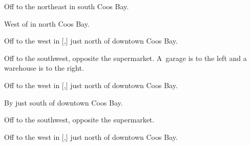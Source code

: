 

\begin{LocationList}

Off  to the northeast in south Coos Bay.

\Location{\GasStation \Gas}
West of  in north Coos Bay.

Off  to the west in [,] just north of downtown Coos Bay.

Off  to the southwest, opposite the supermarket.
A~garage is to the left and a warehouse is to the right.

Off  to the west in [,] just north of downtown Coos Bay.

By  just south of downtown Coos Bay.

Off  to the southwest, opposite the supermarket.

\Location{\TruckService \Rest \Service}
Off  to the west in [,] just north of downtown Coos Bay.

\end{LocationList}
